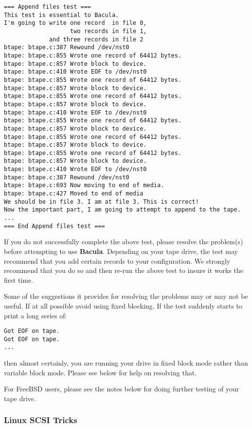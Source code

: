 \footnotesize
\begin{verbatim}
=== Append files test ===
This test is essential to Bacula.
I'm going to write one record  in file 0,
                   two records in file 1,
             and three records in file 2
btape: btape.c:387 Rewound /dev/nst0
btape: btape.c:855 Wrote one record of 64412 bytes.
btape: btape.c:857 Wrote block to device.
btape: btape.c:410 Wrote EOF to /dev/nst0
btape: btape.c:855 Wrote one record of 64412 bytes.
btape: btape.c:857 Wrote block to device.
btape: btape.c:855 Wrote one record of 64412 bytes.
btape: btape.c:857 Wrote block to device.
btape: btape.c:410 Wrote EOF to /dev/nst0
btape: btape.c:855 Wrote one record of 64412 bytes.
btape: btape.c:857 Wrote block to device.
btape: btape.c:855 Wrote one record of 64412 bytes.
btape: btape.c:857 Wrote block to device.
btape: btape.c:855 Wrote one record of 64412 bytes.
btape: btape.c:857 Wrote block to device.
btape: btape.c:410 Wrote EOF to /dev/nst0
btape: btape.c:387 Rewound /dev/nst0
btape: btape.c:693 Now moving to end of media.
btape: btape.c:427 Moved to end of media
We should be in file 3. I am at file 3. This is correct!
Now the important part, I am going to attempt to append to the tape.
...
=== End Append files test ===
\end{verbatim}
\normalsize

If you do not successfully complete the above test, please resolve the
problem(s) before attempting to use {\bf Bacula}. Depending on your tape
drive, the test may recommend that you add certain records to your
configuration. We strongly recommend that you do so and then re-run the above
test to insure it works the first time. 

Some of the suggestions it provides for resolving the problems may or may not
be useful. If at all possible avoid using fixed blocking. If the test suddenly
starts to print a long series of: 

\footnotesize
\begin{verbatim}
Got EOF on tape.
Got EOF on tape.
...
\end{verbatim}
\normalsize

then almost certainly, you are running your drive in fixed block mode rather
than variable block mode. Please see below for help on resolving that. 

For FreeBSD users, please see the notes below for doing further testing of
your tape drive. 

\subsubsection*{Linux SCSI Tricks}

